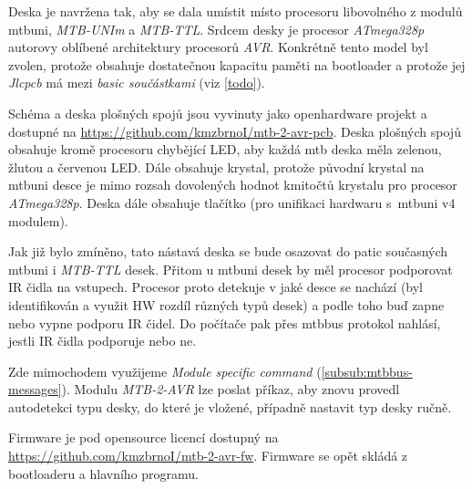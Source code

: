 Deska je navržena tak, aby se dala umístit místo procesoru libovolného z modulů
\gls{mtbuni}, \textit{MTB-UNIm} a \textit{MTB-TTL}. Srdcem desky je procesor
\textit{ATmega328p} autorovy oblíbené architektury procesorů \textit{AVR}.
Konkrétně tento model byl zvolen, protože obsahuje dostatečnou kapacitu paměti
na bootloader a protože jej \textit{Jlcpcb} má mezi \textit{basic součástkami}
(viz \ref{todo}).

Schéma a deska plošných spojů jsou vyvinuty jako openhardware projekt a dostupné
na \url{https://github.com/kmzbrnoI/mtb-2-avr-pcb}. Deska plošných spojů obsahuje
kromě procesoru chybějící LED, aby každá \gls{mtb} deska měla zelenou, žlutou a
červenou LED. Dále obsahuje krystal, protože původní krystal na \gls{mtbuni}
desce je mimo rozsah dovolených hodnot kmitočtů krystalu pro procesor
\textit{ATmega328p}. Deska dále obsahuje tlačítko (pro unifikaci hardwaru
s~\gls{mtbuni} v4 modulem).

Jak již bylo zmíněno, tato nástavá deska se bude osazovat do patic současných
\gls{mtbuni} i \textit{MTB-TTL} desek. Přitom u \gls{mtbuni} desek by měl procesor
podporovat IR čidla na vstupech. Procesor proto detekuje v jaké desce se nachází
(byl identifikován a využit HW rozdíl různých typů desek) a podle toho buď
zapne nebo vypne podporu IR čidel. Do počítače pak přes \gls{mtbbus} protokol
nahlásí, jestli IR čidla podporuje nebo ne.

Zde mimochodem využijeme \textit{Module specific command} (\ref{subsub:mtbbus-messages}). Modulu
\textit{MTB-2-AVR} lze poslat příkaz, aby znovu provedl autodetekci typu
desky, do které je vložené, případně nastavit typ desky ručně.

Firmware je pod opensource licencí dostupný na
\url{https://github.com/kmzbrnoI/mtb-2-avr-fw}. Firmware se opět skládá
z bootloaderu a hlavního programu.
